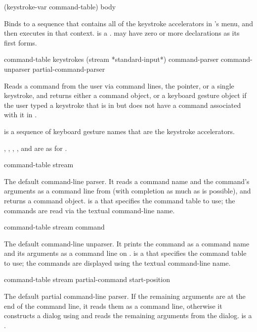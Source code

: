  {(keystroke-var command-table) \body body}

Binds  to a sequence that contains all of the keystroke
accelerators in 's menu, and then executes  in that
context.   is a .  
may have zero or more declarations as its first forms.

 {command-table keystrokes
                                        \key (stream *standard-input*)
                                             command-parser command-unparser
                                             partial-command-parser}

Reads a command from the user via command lines, the pointer, or a single
keystroke, and returns either a command object, or a keyboard gesture object if
the user typed a keystroke that is in  but does not have a
command associated with it in .

 is a sequence of keyboard gesture names that are the keystroke
accelerators.

, , , ,
and  are as for .


 {command-table stream}

The default command-line parser.  It reads a command name and the command's
arguments as a command line from  (with completion as much as is
possible), and returns a command object.   is a  that specifies the command table to use; the commands are read
via the textual command-line name.

 {command-table stream command}

The default command-line unparser.  It prints the command  as a
command name and its arguments as a command line on .
 is a  that specifies the
command table to use; the commands are displayed using the textual command-line
name.

       {command-table stream partial-command start-position}

The default partial command-line parser.  If the remaining arguments are at the
end of the command line, it reads them as a command line, otherwise it
constructs a dialog using  and reads the remaining
arguments from the dialog.   is a .

